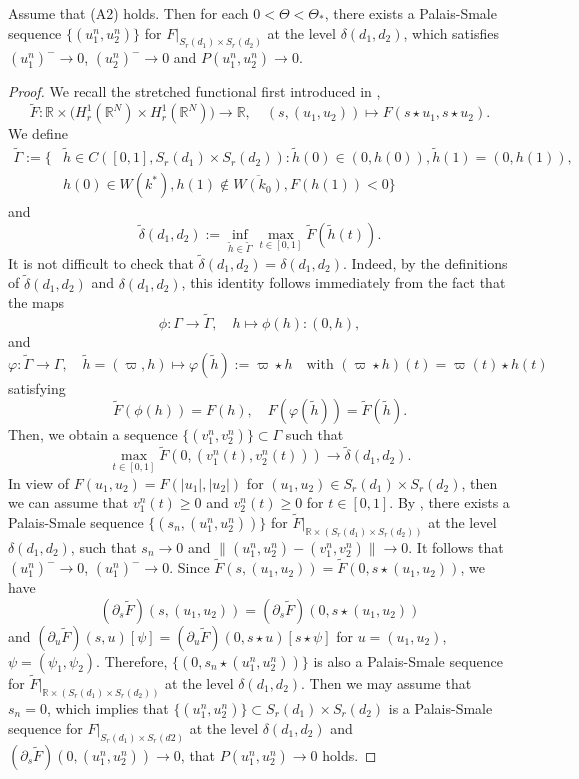 \documentclass[reqno]{amsart}
\begin{document}
\begin{lemma}\label{str4}
 Assume that {\rm (A2)} holds. Then for each $0<\Theta<\Theta_*$, there exists 
a Palais-Smale sequence $\{(u_1^n,u_2^n)\}$ for $F|_{S_r(d_1)\times S_r(d_2)}$
at the level $\delta(d_1,d_2)$, which satisfies $(u_1^n)^-\to 0$, $(u_2^n)^-\to 0$ 
and $P(u_1^n,u_2^n)\to 0$.
\end{lemma}

\begin{proof}
We recall the stretched functional first introduced in \cite{97Na},
 \[
\tilde{F}: \mathbb{R}\times \Big(H_r^1(\mathbb{R}^N)\times H_r^1(\mathbb{R}^N)\Big)
\to \mathbb{R}, \quad (s,(u_1,u_2))\mapsto F(s\star u_1,s\star u_2).
 \]
We define
\begin{align*}
\tilde{\Gamma}:= \big\{&\tilde{h}\in C([0,1],S_r(d_1)\times S_r(d_2)):\tilde{h}(0)
\in(0,h(0)),\tilde{h}(1)=(0,h(1)),\\
&h(0)\in W(k^*),h(1)\notin\overline{W(k_0)},F(h(1))<0\big\}
\end{align*}
and
\[
\tilde{\delta}(d_1,d_2)
:=\inf_{\tilde{h}\in\tilde{\Gamma}}\max_{t\in[0,1]}\tilde{F}(\tilde{h}(t)).
\]
It is not difficult to check that $\tilde{\delta}(d_1,d_2)=\delta(d_1,d_2)$.
Indeed, by the definitions of $\tilde{\delta}(d_1,d_2)$ and $\delta(d_1,d_2)$,
this identity follows immediately from the fact that the maps
\[
\phi: \Gamma\to \tilde{\Gamma}, \quad h\mapsto \phi(h):(0,h),
\]
and
\[
 \varphi : \tilde{\Gamma}\to \Gamma, \quad
 \tilde{h}=(\varpi,h)\mapsto\varphi(\tilde{h}):=\varpi\star h \quad
  \text{with } (\varpi\star h)(t)=\varpi(t)\star h(t)
\]
satisfying
\[
\tilde{F}(\phi(h))=F(h),\quad  F(\varphi(\tilde{h}))=\tilde{F}(\tilde{h}).
\]
Then, we obtain a sequence $\{(v_1^n,v_2^n)\}\subset\Gamma$ such that
\[
\max_{t\in[0,1]}\tilde{F}(0,(v_1^n(t),v_2^n(t)))\to \tilde{\delta}(d_1,d_2).
\]
In view of $F(u_1,u_2)=F(|u_1|,|u_2|)$ for $(u_1,u_2)\in S_r(d_1)\times S_r(d_2)$,
then we can assume that $v_1^n(t)\geq0$ and $v_2^n(t)\geq0$ for $t\in[0,1]$.
By \cite[Theorem 4.1]{sben}, there exists a Palais-Smale sequence
$\{(s_n,(u_1^n,u_2^n))\}$ for $\tilde{F}|_{\mathbb{R}\times(S_r(d_1)\times S_r(d_2))}$
at the level $\delta(d_1,d_2)$, such that $s_n\to 0$ and
$\| (u_1^n,u_2^n)-(v_1^n,v_2^n)\|\to 0$. It follows that
$(u_1^n)^-\to 0$, $(u_1^n)^-\to 0$.
Since $\tilde{F}(s,(u_1,u_2))=\tilde{F}(0,s\star(u_1,u_2))$, we have
\[
(\partial_s\tilde{F})(s,(u_1,u_2))=(\partial_s\tilde{F})(0,s\star(u_1,u_2))
\]
and $(\partial_u\tilde{F})(s,u)[\psi]=(\partial_u\tilde{F})(0,s\star u)[s\star\psi]$
for $u=(u_1,u_2)$, $\psi=(\psi_1,\psi_2)$. Therefore,
$\{(0,s_n\star(u_1^n,u_2^n))\}$ is also a Palais-Smale sequence for
$\tilde{F}|_{\mathbb{R}\times(S_r(d_1)\times S_r(d_2))}$ at the level
$\delta(d_1,d_2)$.
Then we may assume that $s_n=0$, which implies that
$\{(u_1^n,u_2^n)\}\subset S_r(d_1)\times S_r(d_2)$ is a Palais-Smale sequence for
$F|_{S_r(d_1)\times S_r(d2)}$ at the level $\delta(d_1,d_2)$ and
$(\partial_s\tilde{F})(0,(u_1^n,u_2^n))\to 0$, that $P(u_1^n,u_2^n)\to 0$ holds.
\end{proof}
\end{document}
